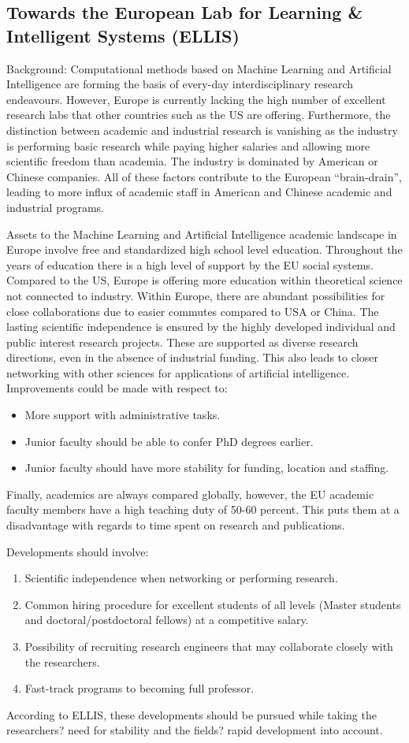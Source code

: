 \documentclass{article}
\begin{document}
\subsection{Towards the European Lab for Learning \& Intelligent Systems (ELLIS)}

Background: Computational methods based on Machine Learning and Artificial Intelligence are forming the basis of every-day interdisciplinary research endeavours. However, Europe is currently lacking the high number of excellent research labs that other countries such as the US are offering. Furthermore, the distinction between academic and industrial research is vanishing as the industry is performing basic research while paying higher salaries and allowing more scientific freedom than academia. The industry is dominated by American or Chinese companies. All of these factors contribute to the European ``brain-drain'', leading to more influx of academic staff in American and Chinese academic and industrial programs.

Assets to the Machine Learning and Artificial Intelligence academic landscape in Europe involve free and standardized high school level education. Throughout the years of education there is a high level of support by the EU social systems. Compared to the US, Europe is offering more education within theoretical science not connected to industry. Within Europe, there are abundant possibilities for close collaborations due to easier commutes compared to USA or China.
The lasting scientific independence is ensured by the highly developed individual and public interest research projects. These are supported as diverse research directions, even in the absence of industrial funding. This also leads to closer networking with other sciences for applications of artificial intelligence.
\noindent
Improvements could be made with respect to:
\begin{itemize}
\item More support with administrative tasks.
\item Junior faculty should be able to confer PhD degrees earlier.
\item Junior faculty should have more stability for funding, location and staffing.
\end{itemize}
Finally, academics are always compared globally, however, the EU academic faculty members have a high teaching duty of 50-60 percent. This puts them at a disadvantage with regards to time spent on research and publications.

\noindent
Developments should involve:
\begin{enumerate}
\item Scientific independence when networking or performing research.
\item Common hiring procedure for excellent students of all levels (Master students and doctoral/postdoctoral fellows) at a competitive salary.
\item Possibility of recruiting research engineers that may collaborate closely with the researchers.
\item Fast-track programs to becoming full professor.
\end{enumerate}

According to ELLIS, these developments should be pursued while taking the researchers? need for stability and the fields? rapid development into account.

\newpage
\end{document}
